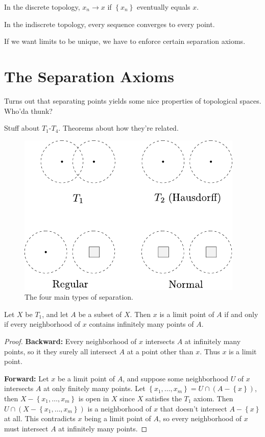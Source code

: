 \documentclass[10pt]{report}
\begin{document}
\begin{ex}[]
In the discrete topology, $x_n \to x$ if $\left\{ x_n \right\}$ eventually equals $x$.

In the indiscrete topology, every sequence converges to every point.
\end{ex}
If we want limits to be unique, we have to enforce certain separation axioms.



\section{The Separation Axioms}

Turns out that separating points yields some nice properties of topological spaces. Who'da thunk?

{\color{red}Stuff about $T_1$-$T_4$. Theorems about how they're related.}

\begin{figure}[H]
	\centering
	\includegraphics[scale=1]{fig/separation.pdf}
	\caption{The four main types of separation.}
\end{figure}

\begin{prop}
	Let $X$ be $T_1$, and let $A$ be a subset of $X$. Then $x$ is a limit point of $A$ if and only if every neighborhood of $x$ contains infinitely many points of $A$.
\end{prop}
\begin{proof}
	\textbf{Backward:} Every neighborhood of $x$ intersects $A$ at infinitely many points, so it they surely all intersect $A$ at a point other than $x$. Thus $x$ is a limit point.

	\textbf{Forward:} Let $x$ be a limit point of $A$, and suppose some neighborhood $U$ of $x$ intersects $A$ at only finitely many points. Let $\left\{ x_1,\dots,x_m \right\} = U \cap (A-\left\{ x \right\})$, then $X - \left\{ x_1,\dots,x_m \right\}$ is open in $X$ since $X$ satisfies the $T_1$ axiom. Then $U \cap (X - \left\{ x_1,\dots,x_m \right\})$ is a neighborhood of $x$ that doesn't intersect $A - \left\{ x \right\}$ at all. This contradicts $x$ being a limit point of $A$, so every neighborhood of $x$ must intersect $A$ at infinitely many points.
\end{proof}
\end{document}
